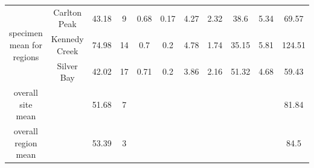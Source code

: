 \documentclass[9pt,twoside,lineno]{pnas-new}
\begin{document}
\begin{table}[]
\begin{tabular}{ccccccccccc}
                                           \hline
\multirow{3}{*}{specimen mean for regions} & Carlton Peak  & 43.18     & 9  & 0.68 & 0.17    & 4.27           & 2.32            & 38.6       & 5.34     & 69.57         \\
                                           & Kennedy Creek & 74.98     & 14 & 0.7  & 0.2     & 4.78           & 1.74            & 35.15      & 5.81     & 124.51        \\
                                           & Silver Bay    & 42.02     & 17 & 0.71 & 0.2     & 3.86           & 2.16            & 51.32      & 4.68     & 59.43         \\
\hline
overall site mean                          &               & 51.68     & 7  &      &         &                &                 &            &          & 81.84         \\
overall region mean                        &               & 53.39     & 3  &      &         &                &                 &            &          & 84.5         
\end{tabular}
\end{table}



\clearpage


\FloatBarrier


\end{document}
